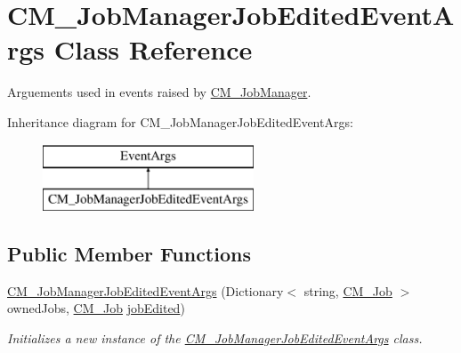 \hypertarget{class_c_m___job_manager_job_edited_event_args}{}\section{C\+M\+\_\+\+Job\+Manager\+Job\+Edited\+Event\+Args Class Reference}
\label{class_c_m___job_manager_job_edited_event_args}


Arguements used in events raised by \hyperlink{class_c_m___job_manager}{C\+M\+\_\+\+Job\+Manager}.  


Inheritance diagram for C\+M\+\_\+\+Job\+Manager\+Job\+Edited\+Event\+Args\+:\begin{figure}[H]
\begin{center}
\leavevmode
\includegraphics[height=2.000000cm]{class_c_m___job_manager_job_edited_event_args}
\end{center}
\end{figure}
\subsection*{Public Member Functions}
\begin{DoxyCompactItemize}
\item 
\hyperlink{class_c_m___job_manager_job_edited_event_args_a4affe52499a44d68c7c0cae61177583f}{C\+M\+\_\+\+Job\+Manager\+Job\+Edited\+Event\+Args} (Dictionary$<$ string, \hyperlink{class_c_m___job}{C\+M\+\_\+\+Job} $>$ owned\+Jobs, \hyperlink{class_c_m___job}{C\+M\+\_\+\+Job} \hyperlink{class_c_m___job_manager_job_edited_event_args_a7ffe2e303d15476afa5fc9d693367a8e}{job\+Edited})
\begin{DoxyCompactList}\small\item\em Initializes a new instance of the \hyperlink{class_c_m___job_manager_job_edited_event_args}{C\+M\+\_\+\+Job\+Manager\+Job\+Edited\+Event\+Args} class. \end{DoxyCompactList}\end{DoxyCompactItemize}
